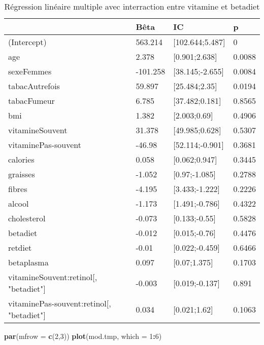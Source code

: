 \documentclass[]{article}
\newenvironment{Shaded}{\begin{snugshade}}{\end{snugshade}}
\newcommand{\KeywordTok}[1]{\textcolor[rgb]{0.13,0.29,0.53}{\textbf{#1}}}
\newcommand{\DataTypeTok}[1]{\textcolor[rgb]{0.13,0.29,0.53}{#1}}
\newcommand{\DecValTok}[1]{\textcolor[rgb]{0.00,0.00,0.81}{#1}}
\newcommand{\OperatorTok}[1]{\textcolor[rgb]{0.81,0.36,0.00}{\textbf{#1}}}
\newcommand{\NormalTok}[1]{#1}
\begin{document}
\begin{table}

\caption{\label{tab:unnamed-chunk-73}Régression linéaire multiple avec interraction entre vitamine et betadiet}
\centering
\begin{tabular}[t]{l|l|l|l}
\hline
  & Bêta & IC & p\\
\hline
\rowcolor[HTML]{BBD2E1}  (Intercept) & 563.214 & [102.644;5.487] & 0\\
\hline
age & 2.378 & [0.901;2.638] & 0.0088\\
\hline
\rowcolor[HTML]{BBD2E1}  sexeFemmes & -101.258 & [38.145;-2.655] & 0.0084\\
\hline
tabacAutrefois & 59.897 & [25.484;2.35] & 0.0194\\
\hline
\rowcolor[HTML]{BBD2E1}  tabacFumeur & 6.785 & [37.482;0.181] & 0.8565\\
\hline
bmi & 1.382 & [2.003;0.69] & 0.4906\\
\hline
\rowcolor[HTML]{BBD2E1}  vitamineSouvent & 31.378 & [49.985;0.628] & 0.5307\\
\hline
vitaminePas-souvent & -46.98 & [52.114;-0.901] & 0.3681\\
\hline
\rowcolor[HTML]{BBD2E1}  calories & 0.058 & [0.062;0.947] & 0.3445\\
\hline
graisses & -1.052 & [0.97;-1.085] & 0.2788\\
\hline
\rowcolor[HTML]{BBD2E1}  fibres & -4.195 & [3.433;-1.222] & 0.2226\\
\hline
alcool & -1.173 & [1.491;-0.786] & 0.4322\\
\hline
\rowcolor[HTML]{BBD2E1}  cholesterol & -0.073 & [0.133;-0.55] & 0.5828\\
\hline
betadiet & -0.012 & [0.015;-0.76] & 0.4476\\
\hline
\rowcolor[HTML]{BBD2E1}  retdiet & -0.01 & [0.022;-0.459] & 0.6466\\
\hline
betaplasma & 0.097 & [0.07;1.375] & 0.1703\\
\hline
\rowcolor[HTML]{BBD2E1}  vitamineSouvent:retinol[, "betadiet"] & -0.003 & [0.019;-0.137] & 0.891\\
\hline
vitaminePas-souvent:retinol[, "betadiet"] & 0.034 & [0.021;1.62] & 0.1063\\
\hline
\end{tabular}
\end{table}

\begin{Shaded}
\begin{Highlighting}[]
\KeywordTok{par}\NormalTok{(}\DataTypeTok{mfrow =} \KeywordTok{c}\NormalTok{(}\DecValTok{2}\NormalTok{,}\DecValTok{3}\NormalTok{))}
\KeywordTok{plot}\NormalTok{(mod.tmp, }\DataTypeTok{which =} \DecValTok{1}\OperatorTok{:}\DecValTok{6}\NormalTok{)}
\end{Highlighting}
\end{Shaded}
\end{document}
